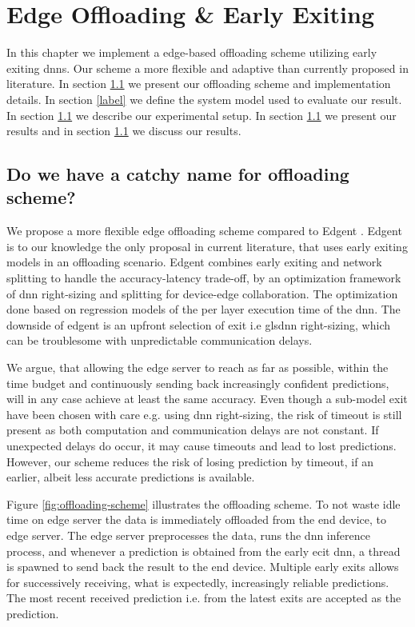 \chapter{Edge Offloading \& Early Exiting}

In this chapter we implement a edge-based offloading scheme utilizing early exiting \gls{dnn}s. Our scheme a more flexible and adaptive than currently proposed in literature. In section \ref{} we present our offloading scheme and implementation details. In section \ref{label} we define the system model used to evaluate our result. In section \ref{} we describe our experimental setup. In section \ref{} we present our results and in section \ref{} we discuss our results.

\section{Do we have a catchy name for offloading scheme?}

We propose a more flexible edge offloading scheme compared to Edgent \cite{li_edge_2018}. Edgent is to our knowledge the only proposal in current literature, that uses early exiting models in an offloading scenario. Edgent combines early exiting and network splitting to handle the accuracy-latency trade-off, by an optimization framework of \gls{dnn} right-sizing and splitting for device-edge collaboration. The optimization done based on regression models of the per layer execution time of the \gls{dnn}. The downside of edgent is an upfront selection of exit i.e gls{dnn} right-sizing, which can be troublesome with unpredictable communication delays. 

We argue, that allowing the edge server to reach as far as possible, within the time budget and continuously sending back increasingly confident predictions, will in any case achieve at least the same accuracy. Even though a sub-model exit have been chosen with care e.g. using \gls{dnn} right-sizing, the risk of timeout is still present as both computation and communication delays are not constant. If unexpected delays do occur, it may cause timeouts and lead to lost predictions. However, our scheme reduces the risk of losing prediction by timeout, if an earlier, albeit less accurate predictions is available. 

Figure \ref{fig:offloading-scheme} illustrates the offloading scheme. To not waste idle time on edge server the data is immediately offloaded from the end device, to edge server. The edge server preprocesses the data, runs the \gls{dnn} inference process, and whenever a prediction is obtained from the early ecit \gls{dnn}, a thread is spawned to send back the result to the end device. Multiple early exits allows for successively receiving, what is expectedly, increasingly reliable predictions. The most recent received prediction i.e. from the latest exits are accepted as the prediction.

